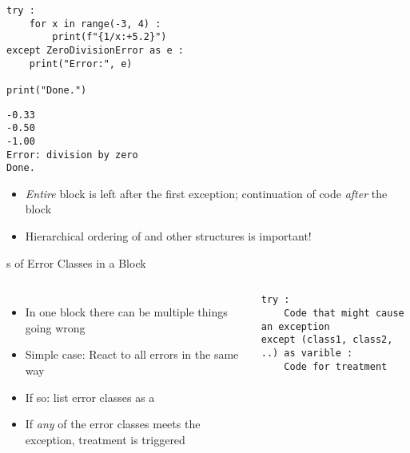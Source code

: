 \begin{frame}[fragile]
%
\begin{tcbraster}[raster columns=2,
                  raster equal height,
                  nobeforeafter,
                  raster column skip=0.2cm]
\begin{codebox}
\begin{verbatim}
try :
    for x in range(-3, 4) :
        print(f"{1/x:+5.2}")
except ZeroDivisionError as e :
    print("Error:", e)

print("Done.")
\end{verbatim}
\end{codebox}
%
\begin{cmdbox}
\begin{verbatim}
-0.33
-0.50
-1.00
Error: division by zero
Done.
\end{verbatim}
\end{cmdbox}
\end{tcbraster}
%
\begin{center}
\begin{itemize}
\item[\Thus] \emph{Entire}  block is left after the first exception; continuation of code \emph{after} the  block
\item[\Thus] Hierarchical ordering of  and other structures is important!
\end{itemize}
\end{center}
%
\end{frame}


\begin{frame}[fragile]{s of Error Classes in a  Block}
%
\begin{columns}[T]
\begin{itemize}
\item In one  block there can be multiple things going wrong
\item Simple case: React to all errors in the same way
\item If so: list error classes as a 
\item[\Thus] If \emph{any} of the error classes meets the exception, treatment is triggered
\end{itemize}
%
\vspace{-6pt}
\begin{codebox}
\begin{verbatim}
try :
    Code that might cause an exception
except (class1, class2, ..) as varible :
    Code for treatment
\end{verbatim}
\end{codebox}
\end{columns}
%
\end{frame}

